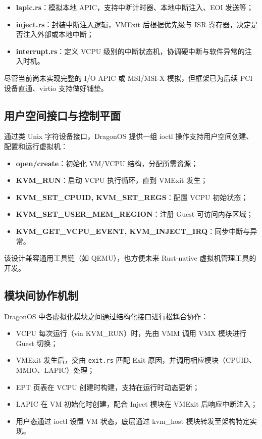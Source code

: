 \documentclass[analyze]{mancls}
\begin{document}
\begin{itemize}
    \item \textbf{lapic.rs}：模拟本地 APIC，支持中断计时器、本地中断注入、EOI 发送等；
    \item \textbf{inject.rs}：封装中断注入逻辑，VMExit 后根据优先级与 ISR 寄存器，决定是否注入外部或本地中断；
    \item \textbf{interrupt.rs}：定义 VCPU 级别的中断状态机，协调硬中断与软件异常的注入时机。
\end{itemize}

尽管当前尚未实现完整的 I/O APIC 或 MSI/MSI-X 模拟，但框架已为后续 PCI 设备直通、virtio 支持做好铺垫。

\subsection{用户空间接口与控制平面}
通过类 Unix 字符设备接口，DragonOS 提供一组 ioctl 操作支持用户空间创建、配置和运行虚拟机：

\begin{itemize}
    \item \textbf{open/create}：初始化 VM/VCPU 结构，分配所需资源；
    \item \textbf{KVM\_RUN}：启动 VCPU 执行循环，直到 VMExit 发生；
    \item \textbf{KVM\_SET\_CPUID, KVM\_SET\_REGS}：配置 VCPU 初始状态；
    \item \textbf{KVM\_SET\_USER\_MEM\_REGION}：注册 Guest 可访问内存区域；
    \item \textbf{KVM\_GET\_VCPU\_EVENT, KVM\_INJECT\_IRQ}：同步中断与异常。
\end{itemize}

该设计兼容通用工具链（如 QEMU），也方便未来 Rust-native 虚拟机管理工具的开发。

\subsection{模块间协作机制}
DragonOS 中各虚拟化模块之间通过结构化接口进行松耦合协作：

\begin{itemize}
    \item VCPU 每次运行（via KVM\_RUN）时，先由 VMM 调用 VMX 模块进行 Guest 切换；
    \item VMExit 发生后，交由 \texttt{exit.rs} 匹配 Exit 原因，并调用相应模块（CPUID、MMIO、LAPIC）处理；
    \item EPT 页表在 VCPU 创建时构建，支持在运行时动态更新；
    \item LAPIC 在 VM 初始化时创建，配合 Inject 模块在 VMExit 后响应中断注入；
    \item 用户态通过 ioctl 设置 VM 状态，底层通过 kvm\_host 模块转发至架构特定实现。
\end{itemize}
\end{document}

